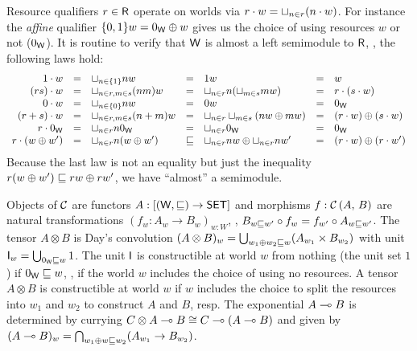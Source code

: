 \documentclass[acmsmall,review,anonymous]{acmart}\settopmatter{printfolios=true,printccs=false,printacmref=false}
\theoremstyle{remark}
\begin{document}
Resource qualifiers $r \in \mathsf{R}$ operate on worlds via
$r \cdot w = \sqcup_{n \in r} (n \cdot w)$.
%
For instance the \emph{affine} qualifier $\{0,1\}w = 0_{\mathsf{W}} \oplus w$
gives us the choice of using resources $w$ or not ($0_{\mathsf{W}}$).
%
It is routine to verify that $\mathsf{W}$ is almost a left semimodule to $\mathsf{R}$,
\ie, the following laws hold:
\[
\begin{array}{rclclcl}
  1 \cdot w
    & = & \sqcup_{n \in \{1\}} nw
    & = & 1w
    & = & w
\\
  (rs) \cdot w
    & = & \sqcup_{n \in r, m \in s} (nm)w
    & = & \sqcup_{n \in r} n(\sqcup_{m \in s} mw)
    & = & r \cdot (s \cdot w)
\\
  0 \cdot w
    & = & \sqcup_{n \in \{0\}} nw
    & = & 0w
    & = & 0_{\mathsf{W}}
\\
  (r + s) \cdot w
    & = & \sqcup_{n \in r, m \in s} (n+m)w
    & = & \sqcup_{n \in r} \sqcup_{m \in s} (nw \oplus mw)
    & = & (r \cdot w) \oplus (s \cdot w)
\\
  r \cdot 0_{\mathsf{W}}
    & = & \sqcup_{n \in r} n0_{\mathsf{W}}
    & = & \sqcup_{n \in r} 0_{\mathsf{W}}
    & = & 0_{\mathsf{W}}
\\
  r \cdot (w \oplus w')
    & = & \sqcup_{n \in r} n(w \oplus w')
    & \sqsubseteq & \sqcup_{n \in r} nw \oplus \sqcup_{n \in r} nw'
    & = & (r \cdot w) \oplus (r \cdot w')
\\
\end{array}
\]
Because the last law is not an equality but just the inequality
$r (w \oplus w') \sqsubseteq rw \oplus rw'$, we have ``almost'' a
semimodule.

Objects of $\mathcal{C}$ are functors $A : [(\mathsf{W},\sqsubseteq) \to \mathsf{SET}]$ and morphisms
$f : \mathcal{C}\,(A,\,B)$ are natural transformations
$(f_w : A_w \to B_w)_{w:W}$, \ie,
$B_{w \sqsubseteq w'} \circ f_w = f_{w'} \circ A_{w \sqsubseteq w'}$.  The tensor
$A \otimes B$ is Day's convolution
$(A \otimes B)_w = \bigcup_{w_1 \oplus w_2 \sqsubseteq w} (A_{w_1} \times B_{w_2})$
with unit $\mathsf{I}_w = \bigcup_{0_{\mathsf{W}} \sqsubseteq w} 1$.  The unit $\mathsf{I}$ is
constructible at world $w$ from nothing (the unit set $1$) if $0_{\mathsf{W}} \sqsubseteq w$,
\ie, if the world $w$ includes the choice of using no resources.  A
tensor $A \otimes B$ is constructible at world $w$ if $w$ includes the
choice to split the resources into $w_1$ and $w_2$ to construct $A$
and $B$, resp.  The exponential $A \multimap B$ is determined by currying
$C \otimes A \multimap B \cong C \multimap (A \multimap B)$ and given by
$(A \multimap B)_w = \bigcap_{w_1 \oplus w \sqsubseteq w_2} (A_{w_1} \to
B_{w_2})$.
\end{document}
